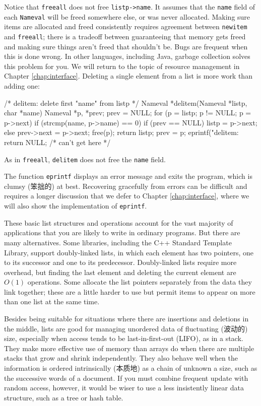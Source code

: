 Notice that \verb'freeall' does not free \verb'listp->name'. It assumes
that the \verb'name' field of each \verb'Nameval' will be freed somewhere
else, or was never allocated. Making sure items are allocated and freed
consistently requires agreement between \verb'newitem' and \verb'freeall';
there is a tradeoff between guaranteeing that memory gets freed
and making sure things aren't freed that shouldn't be. Bugs are frequent
when this is done wrong. In other languages, including Java, garbage
collection solves this problem for you. We will return to the topic of
resource management in Chapter \ref{chap:interface}. Deleting a single
element from a list is more work than adding one:
\begin{wellcode}
    /* delitem: delete first "name" from listp */
    Nameval *delitem(Nameval *listp, char *name)
    {
        Nameval *p, *prev;
        prev = NULL;
        for (p = listp; p != NULL; p = p->next) {
            if (strcmp(name, p->name) == 0) {
                if (prev == NULL)
                    listp = p->next;
                else
                    prev->next = p->next;
                free(p);
                return listp;
            }
            prev = p;
        }
        eprintf("delitem: %
        return NULL;    /* can't get here */
    }
\end{wellcode}
As in \verb'freeall', \verb'delitem' does not free the \verb'name' field.

The function \verb'eprintf' displays an error message and exits the
program, which is clumsy (笨拙的) at best. Recovering gracefully from
errors can be difficult and requires a longer discussion that we defer to
Chapter \ref{chap:interface}, where we will also show the implementation of
\verb'eprintf'.

These basic list structures and operations account for the vast majority of
applications that you are likely to write in ordinary programs. But there
are many alternatives. Some libraries, including the C++ Standard Template
Library, support doubly-linked lists, in which each element has two
pointers, one to its successor and one to its predecessor. Doubly-linked
lists require more overhead, but finding the last element and deleting the
current element are $O(1)$ operations. Some allocate the list pointers
separately from the data they link together; these are a little harder to
use but permit items to appear on more than one list at the same time.

Besides being suitable for situations where there are insertions and
deletions in the middle, lists are good for managing unordered data of
fluctuating (波动的) size, especially when access tends to be
last-in-first-out (LIFO), as in a stack. They make more effective use of
memory than arrays do when there are multiple stacks that grow and shrink
independently. They also behave well when the information is ordered
intrinsically (本质地) as a chain of unknown a  size, such as
the successive words of a document. If you must combine frequent update
with random access, however, it would be wiser to use a less insistently
linear data structure, such as a tree or hash table.

